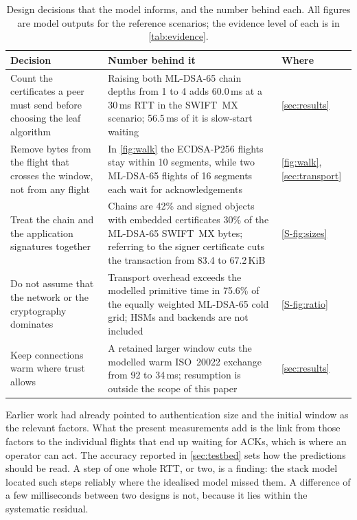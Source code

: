 \documentclass[preprint,12pt]{elsarticle}
\newcommand{\ms}{\,ms\xspace}
\begin{document}
\begin{table}[!ht]
\centering\small
\caption{Design decisions that the model informs, and the number behind each. All figures are model outputs for the reference scenarios; the evidence level of each is in \cref{tab:evidence}.}
\label{tab:decisions}
\renewcommand{\arraystretch}{1.05}
\begin{tabularx}{\textwidth}{@{}>{\raggedright\arraybackslash}p{}>{\raggedright\arraybackslash}X>{\raggedright\arraybackslash}p{}@{}}
\toprule
Decision & Number behind it & Where \\
\midrule
Count the certificates a peer must send before choosing the leaf algorithm & Raising both ML-DSA-65 chain depths from 1 to 4 adds 60.0\ms at a 30\ms RTT in the SWIFT~MX scenario; 56.5\ms of it is slow-start waiting & \cref{sec:results} \\
Remove bytes from the flight that crosses the window, not from any flight & In \cref{fig:walk} the ECDSA-P256 flights stay within 10 segments, while two ML-DSA-65 flights of 16 segments each wait for acknowledgements & \cref{fig:walk}, \cref{sec:transport} \\
Treat the chain and the application signatures together & Chains are 42\% and signed objects with embedded certificates 30\% of the ML-DSA-65 SWIFT~MX bytes; referring to the signer certificate cuts the transaction from 83.4 to 67.2\,KiB & \cref{S-fig:sizes} \\
Do not assume that the network or the cryptography dominates & Transport overhead exceeds the modelled primitive time in 75.6\% of the equally weighted ML-DSA-65 cold grid; HSMs and backends are not included & \cref{S-fig:ratio} \\
Keep connections warm where trust allows & A retained larger window cuts the modelled warm ISO~20022 exchange from 92 to 34\ms; resumption is outside the scope of this paper & \cref{sec:results} \\
\bottomrule
\end{tabularx}
\end{table}

Earlier work had already pointed to authentication size and the initial window as the relevant factors. What the present measurements add is the link from those factors to the individual flights that end up waiting for ACKs, which is where an operator can act. The accuracy reported in \cref{sec:testbed} sets how the predictions should be read. A step of one whole RTT, or two, is a finding: the stack model located such steps reliably where the idealised model missed them. A difference of a few milliseconds between two designs is not, because it lies within the systematic residual.
\end{document}
